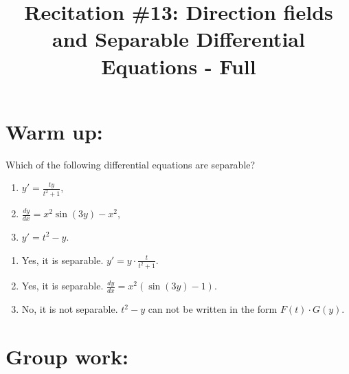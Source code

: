 \documentclass[]{ximera}
\title{Recitation \#13: Direction fields and Separable Differential Equations - Full}
\begin{document}
\begin{abstract}		\end{abstract}
\maketitle




\section{Warm up:}
	Which of the following differential equations are separable?
	\begin{enumerate}
	\item $y' = \frac{ty}{t^2+1}$,
	\item $\frac{dy}{dx} =x^2 \sin (3y) -x^2$,
	\item $y' = t^2 - y$.
	\end{enumerate}

	\begin{freeResponse}
	\begin{enumerate}
	\item Yes, it is separable. $y' = y \cdot \frac{t}{t^2+1}$.
	\item Yes, it is separable. $\frac{dy}{dx} = x^2 \left( \sin(3y)-1 \right)$.
	\item No, it is not separable. $t^2-y$ can not be written in the form $F(t) \cdot G(y)$. 
	\end{enumerate}
	\end{freeResponse}
	
\begin{instructorNotes}

\end{instructorNotes}








\section{Group work:}
\end{document}
